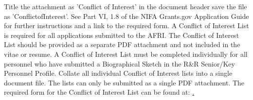 \documentclass[12pt,letterpaper]{article}
\title{\ruleline{Conflict of Interest}}
\begin{document}
\maketitle
\linenumbers

Title the attachment as 'Conflict of Interest' in the document header save the
file as 'ConflictofInterest'. See Part VI, 1.8 of the NIFA Grants.gov
Application Guide for further instructions and a link to the required form. A
Conflict of Interest List is required for all applications submitted to the
AFRI. The Conflict of Interest List should be provided as a separate PDF
attachment and not included in the vitae or resume. A Conflict of Interest List
must be completed individually for all personnel who have submitted a
Biographical Sketch in the R\&R Senior/Key Personnel Profile. Collate all
individual Conflict of Interest lists into a single document file. The lists can
only be submitted as a single PDF attachment. The required form for the Conflict
of Interest List can be found at:
\href{www.nifa.usda.gov/funding/templates/conflict_of_interest.doc}.

\lipsum[1]
\end{document}
